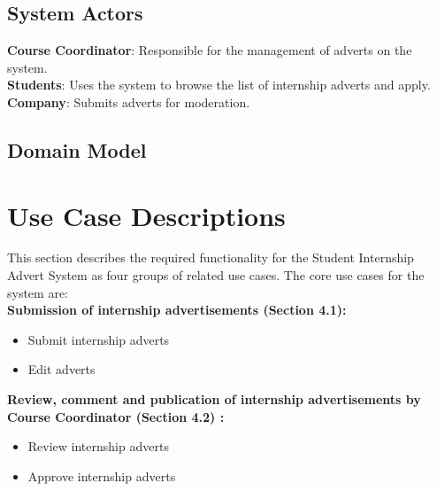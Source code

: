 \documentclass{l3deliverable}
\begin{document}

\subsection{System Actors}
\textbf{Course Coordinator}: Responsible for the management of adverts on the system.\\
\textbf{Students}: Uses the system to browse the list of internship adverts and apply.\\
\textbf{Company}: Submits adverts for moderation.\\


\subsection{Domain Model}



\section{Use Case Descriptions}

This section describes the required functionality for the Student Internship Advert System as
four groups of related
use cases. The core use cases for the system are:\\

\textbf{Submission of internship advertisements (Section 4.1):}
\begin{itemize}
\item Submit internship adverts
\item Edit adverts 
\end{itemize}

\textbf{Review, comment and publication of internship advertisements by Course Coordinator
(Section 4.2) :}
\begin{itemize}
\item Review internship adverts
\item Approve internship adverts
\end{itemize}
\end{document}
